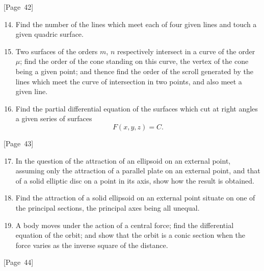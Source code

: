 \documentclass[11pt,a4paper]{article}
\theoremstyle{plain}
\theoremstyle{definition}
\theoremstyle{remark}
\begin{document}
\begin{center}
[Page~42]
\end{center}

\begin{enumerate}
\setcounter{enumi}{13}
\item Find the number of the lines which meet each of four given lines
and touch a given quadric surface.

\item Two surfaces of the orders $m$, $n$ respectively intersect in a
curve of the order $\mu$; find the order of the cone standing on this
curve, the vertex of the cone being a given point; and thence find the
order of the scroll generated by the lines which meet the curve of
intersection in two points, and also meet a given line.

\item Find the partial differential equation of the surfaces which cut
at right angles a given series of surfaces
\[
F(x,y,z) = C.
\]
\end{enumerate}

\begin{center}
[Page~43]
\end{center}

\begin{enumerate}
\setcounter{enumi}{16}
\item In the question of the attraction of an ellipsoid on an external
point, assuming only the attraction of a parallel plate on an external
point, and that of a solid elliptic disc on a point in its axis, show
how the result is obtained.

\item Find the attraction of a solid ellipsoid on an external point
situate on one of the principal sections, the principal axes being all
unequal.

\item A body moves under the action of a central force; find the
differential equation of the orbit; and show that the orbit is a conic
section when the force varies as the inverse square of the distance.
\end{enumerate}

\begin{center}
[Page~44]
\end{center}
\end{document}
